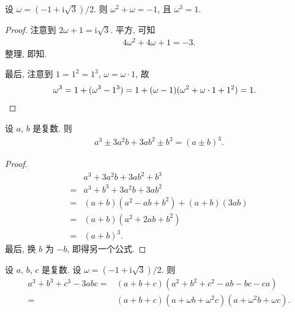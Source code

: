 \documentclass[%
    UTF8,%
    fontset=none,%
    punct=kaiming,%
    zihao=-4,%
    a4paper,%
    oneside,%
]{ctexbook}
\begin{document}
\begin{theorem}
    设 \(\omega = (-1 + \mathrm{i} \sqrt{3})/2\).
    则 \(\omega^2 + \omega = -1\),
    且 \(\omega^3 = 1\).
\end{theorem}

\begin{proof}
    注意到 \(2\omega + 1 = \mathrm{i} \sqrt{3}\).
    平方, 可知
    \begin{align*}
        4\omega^2 + 4\omega + 1 = -3.
    \end{align*}
    整理, 即知.

    最后, 注意到 \(1 = 1^2 = 1^3\),
    \(\omega = \omega \cdot 1\),
    故
    \begin{align*}
         &
        \omega^3
        = 1 + (\omega^3 - 1^3)
        = 1 + (\omega - 1)(\omega^2 + \omega \cdot 1 + 1^2)
        = 1.
        \qedhere
    \end{align*}
\end{proof}

\begin{theorem}
    设 \(a\), \(b\) 是复数.
    则
    \begin{align*}
        a^3 \pm 3a^2 b + 3ab^2 \pm b^3 = (a \pm b)^3.
    \end{align*}
\end{theorem}

\begin{proof}
    \begin{align*}
             & a^3 + 3a^2 b + 3ab^2 + b^3             \\
        = {} & a^3 + b^3 + 3a^2 b + 3ab^2             \\
        = {} & (a + b)(a^2 - ab + b^2) + (a + b)(3ab) \\
        = {} & (a + b)(a^2 + 2ab + b^2)               \\
        = {} & (a + b)^3.
    \end{align*}
    最后, 换 \(b\) 为 \(-b\),
    即得另一个公式.
\end{proof}

\begin{theorem}
    设 \(a\), \(b\), \(c\) 是复数.
    设 \(\omega = (-1 + \mathrm{i} \sqrt{3})/2\).
    则
    \begin{align*}
        a^3 + b^3 + c^3 - 3abc
        = {} & (a + b + c)(a^2 + b^2 + c^2 - ab - bc - ca) \\
        = {} & (a + b + c)(a + \omega b + \omega^2 c)
        (a + \omega^2 b + \omega c).
    \end{align*}
\end{theorem}
\end{document}
